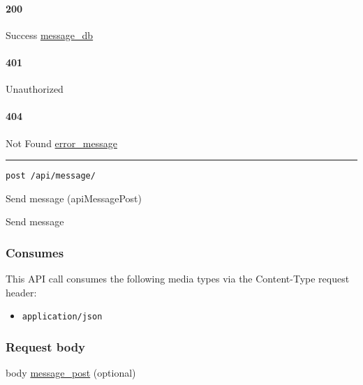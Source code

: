 \hypertarget{section-304}{%
\paragraph{200}\label{section-304}}

Success \protect\hyperlink{message_db}{message\_db}

\hypertarget{section-305}{%
\paragraph{401}\label{section-305}}

Unauthorized \protect\hyperlink{}{}

\hypertarget{section-306}{%
\paragraph{404}\label{section-306}}

Not Found \protect\hyperlink{error_message}{error\_message}

\begin{center}\rule{0.5\linewidth}{\linethickness}\end{center}

\protect\hypertarget{apiMessagePost}{}{}

\begin{verbatim}
post /api/message/
\end{verbatim}

Send message ({apiMessagePost})

Send message

\hypertarget{consumes-30}{%
\subsubsection{Consumes}\label{consumes-30}}

This API call consumes the following media types via the {Content-Type}
request header:

\begin{itemize}
\tightlist
\item
  \texttt{application/json}
\end{itemize}

\hypertarget{request-body-30}{%
\subsubsection{Request body}\label{request-body-30}}

body \protect\hyperlink{message_post}{message\_post} (optional)

